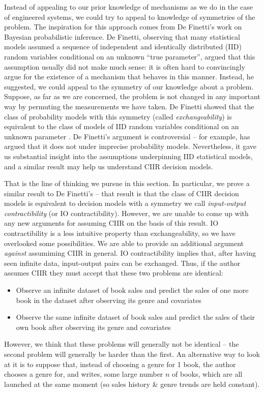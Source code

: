 Instead of appealing to our prior knowledge of mechanisms as we do in the case of engineered systems, we could try to appeal to knowledge of symmetries of the problem. The inspiration for this approach comes from De Finetti's work on Bayesian probabilistic inference. De Finetti, observing that many statistical models assumed a sequence of independent and identically distributed (IID) random variables conditional on an unknown ``true parameter'', argued that this assumption usually did not make much sense: it is often hard to convincingly argue for the existence of a mechanism that behaves in this manner. Instead, he suggested, we could appeal to the symmetry of our knowledge about a problem. Suppose, as far as we are concerned, the problem is not changed in any important way by permuting the measurements we have taken. De Finetti showed that the class of probability models with this symmetry (called \emph{exchangeability}) is equivalent to the class of models of IID random variables conditional on an unknown parameter \citep{de_finetti_foresight_1992}. De Finetti's argument is controversial -- for example, \citet{walley_statistical_1991} has argued that it does not under imprecise probability models. Nevertheless, it gave us substantial insight into the assumptions underpinning IID statistical models, and a similar result may help us understand CIIR decision models.

That is the line of thinking we pursue in this section. In particular, we prove a similar result to De Finetti's -- that result is that the class of CIIR decision models is equivalent to decision models with a symmetry we call \emph{input-output contractibility} (or IO contractibility). However, we are unable to come up with any new arguments for assuming CIIR on the basis of this result. IO contractibility is a less intuitive property than exchangeability, so we have overlooked some possibilities. We are able to provide an additional argument \emph{against} assumiming CIIR in general. IO contractibility implies that, after having seen infinite data, input-output pairs can be exchanged. Thus, if the author assumes CIIR they must accept that these two problems are identical:
\begin{itemize}
    \item Observe an infinite dataset of book sales and predict the sales of one more book in the dataset after observing its genre and covariates
    \item Observe the same infinite dataset of book sales and predict the sales of their own book after observing its genre and covariates
\end{itemize}
However, we think that these problems will generally not be identical -- the second problem will generally be harder than the first. An alternative way to look at it is to suppose that, instead of choosing a genre for 1 book, the author chooses a genre for, and writes, some large number $n$ of books, which are all launched at the same moment (so sales history & genre trends are held constant). 


